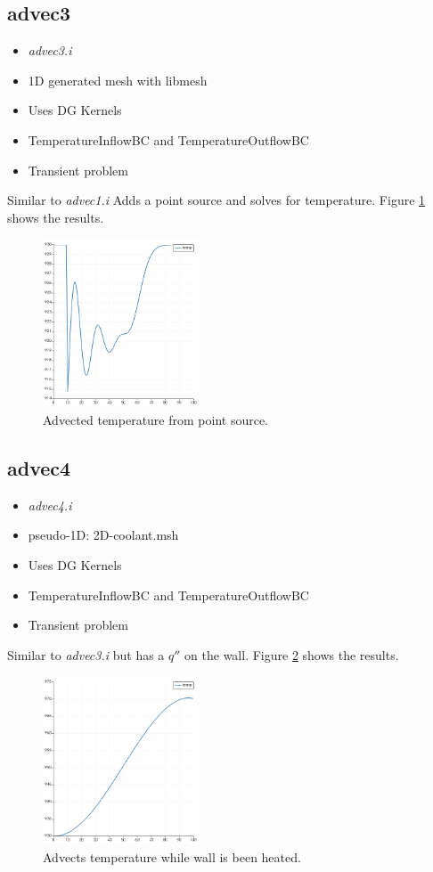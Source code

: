 \documentclass[11pt,letterpaper]{article}
\begin{document}
	\subsection{advec3}

	\begin{itemize}
		\item \textit{advec3.i}
		\item 1D generated mesh with libmesh
		\item Uses DG Kernels
		\item TemperatureInflowBC and TemperatureOutflowBC
		\item Transient problem
	\end{itemize}

    Similar to \textit{advec1.i}
    Adds a point source and solves for temperature.
    Figure \ref{fig:advec3} shows the results.

	\begin{figure}[htbp!]
		\centering
		\includegraphics[height=5cm]{advec3}
		\caption{Advected temperature from point source.}
		\label{fig:advec3}
	\end{figure}

	\subsection{advec4}

	\begin{itemize}
		\item \textit{advec4.i}
		\item pseudo-1D: 2D-coolant.msh
		\item Uses DG Kernels
		\item TemperatureInflowBC and TemperatureOutflowBC
		\item Transient problem
	\end{itemize}

    Similar to \textit{advec3.i} but has a $q''$ on the wall.
    Figure \ref{fig:advec4} shows the results.

	\begin{figure}[htbp!]
		\centering
		\includegraphics[height=5cm]{advec4}
		\caption{Advects temperature while wall is been heated.}
		\label{fig:advec4}
	\end{figure}
\end{document}
